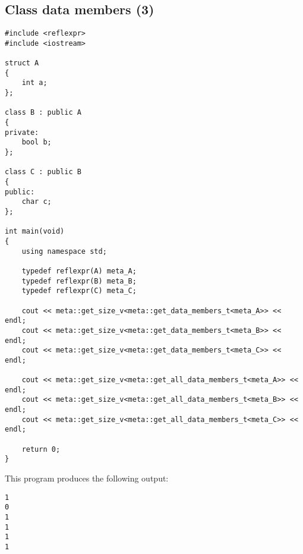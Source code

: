 \subsection{Class data members (3)}

\begin{verbatim}
#include <reflexpr>
#include <iostream>

struct A
{
	int a;
};

class B : public A
{
private:
	bool b;
};

class C : public B
{
public:
	char c;
};

int main(void)
{
	using namespace std;

	typedef reflexpr(A) meta_A;
	typedef reflexpr(B) meta_B;
	typedef reflexpr(C) meta_C;

	cout << meta::get_size_v<meta::get_data_members_t<meta_A>> << endl;
	cout << meta::get_size_v<meta::get_data_members_t<meta_B>> << endl;
	cout << meta::get_size_v<meta::get_data_members_t<meta_C>> << endl;

	cout << meta::get_size_v<meta::get_all_data_members_t<meta_A>> << endl;
	cout << meta::get_size_v<meta::get_all_data_members_t<meta_B>> << endl;
	cout << meta::get_size_v<meta::get_all_data_members_t<meta_C>> << endl;

	return 0;
}
\end{verbatim}

This program produces the following output:

\begin{verbatim}
1
0
1
1
1
1
\end{verbatim}
